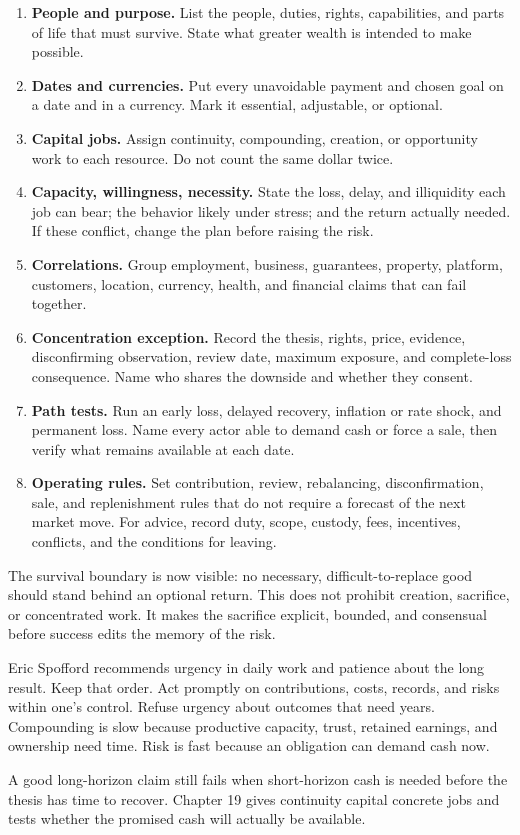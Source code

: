 \begin{enumerate}[itemsep=0.12em]
\item \textbf{People and purpose.} List the people, duties, rights,
  capabilities, and parts of life that must survive. State what greater wealth
  is intended to make possible.
\item \textbf{Dates and currencies.} Put every unavoidable payment and chosen
  goal on a date and in a currency. Mark it essential, adjustable, or optional.
\item \textbf{Capital jobs.} Assign continuity, compounding, creation, or
  opportunity work to each resource. Do not count the same dollar twice.
\item \textbf{Capacity, willingness, necessity.} State the loss, delay, and
  illiquidity each job can bear; the behavior likely under stress; and the
  return actually needed. If these conflict, change the plan before raising the
  risk.
\item \textbf{Correlations.} Group employment, business, guarantees, property,
  platform, customers, location, currency, health, and financial claims that
  can fail together.
\item \textbf{Concentration exception.} Record the thesis, rights, price,
  evidence, disconfirming observation, review date, maximum exposure, and
  complete-loss consequence. Name who shares the downside and whether they
  consent.
\item \textbf{Path tests.} Run an early loss, delayed recovery, inflation or
  rate shock, and permanent loss. Name every actor able to demand cash or force
  a sale, then verify what remains available at each date.
\item \textbf{Operating rules.} Set contribution, review, rebalancing,
  disconfirmation, sale, and replenishment rules that do not require a forecast
  of the next market move. For advice, record duty, scope, custody, fees,
  incentives, conflicts, and the conditions for leaving.
\end{enumerate}

The survival boundary is now visible: no necessary, difficult-to-replace good
should stand behind an optional return. This does not prohibit creation,
sacrifice, or concentrated work. It makes the sacrifice explicit, bounded, and
consensual before success edits the memory of the risk.

Eric Spofford recommends urgency in daily work and patience about the long
result. Keep that order. Act promptly on contributions, costs, records, and
risks within one's control. Refuse urgency about outcomes that need years.
Compounding is slow because productive capacity, trust, retained earnings, and
ownership need time. Risk is fast because an obligation can demand cash now.

A good long-horizon claim still fails when short-horizon cash is needed before
the thesis has time to recover. Chapter 19 gives continuity capital concrete
jobs and tests whether the promised cash will actually be available.
